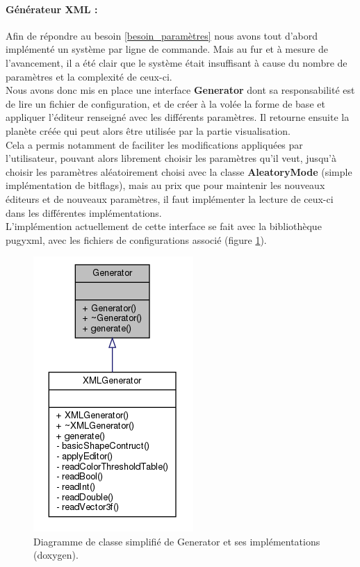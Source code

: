 \documentclass[a4paper]{article}
\begin{document}
\paragraph{Générateur XML :}

Afin de répondre au besoin \ref{besoin_paramètres} nous avons tout d'abord implémenté un système par ligne de commande. Mais au fur et à mesure de l'avancement, il a été clair que le système était insuffisant à cause du nombre de paramètres et la complexité de ceux-ci.\\
Nous avons donc mis en place une interface \textbf{Generator} dont sa responsabilité est de lire un fichier de configuration, et de créer à la volée la forme de base et appliquer l'éditeur renseigné avec les différents paramètres.
Il retourne ensuite la planète créée qui peut alors être utilisée par la partie visualisation.\\
Cela a permis notamment de faciliter les modifications appliquées par l'utilisateur, pouvant alors librement choisir les paramètres qu'il veut, jusqu'à choisir les paramètres aléatoirement choisi avec la classe \textbf{AleatoryMode} (simple implémentation de bitflags), mais au prix que pour maintenir les nouveaux éditeurs et de nouveaux paramètres, il faut implémenter la lecture de ceux-ci dans les différentes implémentations.\\

L'implémention actuellement de cette interface se fait avec la bibliothèque pugyxml, avec les fichiers de configurations associé (figure \ref{archi_generator}).
    \begin{figure}[!h]
        \begin{center} \includegraphics[width=0.3\linewidth]{img/archi/archi_generator.png}\end{center}
        \caption{\label{archi_generator}Diagramme de classe simplifié de Generator et ses implémentations (doxygen).}
    \end{figure}
    
\end{document}
